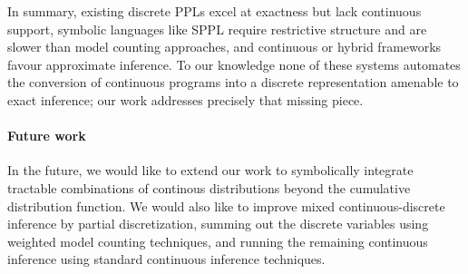 \documentclass[acmsmall,screen,dvipsnames,x11names,nonacm,anonymous,review]{acmart}
\begin{document}
\medskip  
In summary, existing discrete PPLs excel at exactness but lack continuous support, symbolic languages like SPPL require restrictive structure and are slower than model counting approaches, and continuous or hybrid frameworks favour approximate inference. To our knowledge none of these systems automates the conversion of continuous programs into a discrete representation amenable to exact inference; our work addresses precisely that missing piece.

\paragraph{Future work}
In the future, we would like to extend our work to symbolically integrate tractable combinations of continous distributions beyond the cumulative distribution function.
We would also like to improve mixed continuous-discrete inference by partial discretization, summing out the discrete variables using weighted model counting techniques, and running the remaining continuous inference using standard continuous inference techniques.



\end{document}
